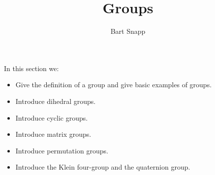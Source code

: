 \documentclass{ximera}
\author{Bart Snapp}
\title{Groups}
\begin{document}
\begin{abstract}
\end{abstract}
\maketitle
In this section we:

\begin{itemize}
\item Give the definition of a group and give basic examples of
  groups.
\item Introduce dihedral groups.
\item Introduce cyclic groups.
\item Introduce matrix groups.
\item Introduce permutation groups.
\item Introduce the Klein four-group and the quaternion group.
\end{itemize}
\end{document}
